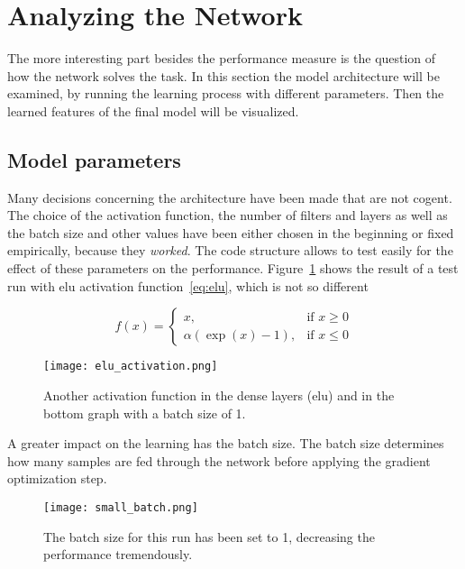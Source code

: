\documentclass[main.tex]{subfiles}
\begin{document}
\section{Analyzing the Network}
The more interesting part besides the performance measure is the question of how the network solves the task. In this section the model architecture will be examined, by running the learning process with different parameters. Then the learned features of the final model will be visualized.


\subsection{Model parameters}
Many decisions concerning the architecture have been made that are not cogent. The choice of the activation function, the number of filters and layers as well as the batch size and other values have been either chosen in the beginning or fixed empirically, because they \emph{worked}. The code structure allows to test easily for the effect of these parameters on the performance. Figure~\ref{fig:other_act} shows the result of a test run with elu activation function~\ref{eq:elu}, which is not so different

\begin{equation} \label{eq:elu}
f(x)= \begin{cases}
    x,& \text{if } x\geq 0\\
    \alpha\left(\exp(x) - 1\right), & \text{if } x\le 0
    \end{cases}
\end{equation}

\begin{figure}
\begin{center}
\texttt{[image: elu\_activation.png]}
\end{center}
\caption{Another activation function in the dense layers (elu) and in the bottom graph with a batch size of 1.}
\label{fig:other_act}
\end{figure}

A greater impact on the learning has the batch size. The batch size determines how many samples are fed through the network before applying the gradient optimization step. 

\begin{figure}
\begin{center}
\texttt{[image: small\_batch.png]}
\end{center}
\caption{The batch size for this run has been set to 1, decreasing the performance tremendously.}
\label{fig:small_batch}
\end{figure}
\end{document}
